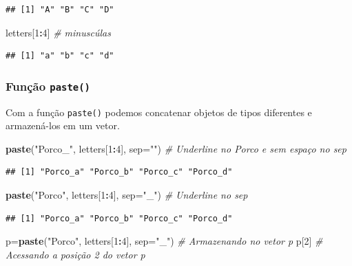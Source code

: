 \documentclass[
]{book}
\newenvironment{Shaded}{\begin{snugshade}}{\end{snugshade}}
\newcommand{\CommentTok}[1]{\textcolor[rgb]{0.56,0.35,0.01}{\textit{#1}}}
\newcommand{\DataTypeTok}[1]{\textcolor[rgb]{0.13,0.29,0.53}{#1}}
\newcommand{\DecValTok}[1]{\textcolor[rgb]{0.00,0.00,0.81}{#1}}
\newcommand{\KeywordTok}[1]{\textcolor[rgb]{0.13,0.29,0.53}{\textbf{#1}}}
\newcommand{\NormalTok}[1]{#1}
\newcommand{\OperatorTok}[1]{\textcolor[rgb]{0.81,0.36,0.00}{\textbf{#1}}}
\newcommand{\StringTok}[1]{\textcolor[rgb]{0.31,0.60,0.02}{#1}}
\theoremstyle{definition}
\theoremstyle{definition}
\theoremstyle{definition}
\theoremstyle{remark}
\begin{document}
\begin{verbatim}
## [1] "A" "B" "C" "D"
\end{verbatim}

\begin{Shaded}
\begin{Highlighting}[]
\NormalTok{letters[}\DecValTok{1}\OperatorTok{:}\DecValTok{4}\NormalTok{] }\CommentTok{# minuscúlas}
\end{Highlighting}
\end{Shaded}

\begin{verbatim}
## [1] "a" "b" "c" "d"
\end{verbatim}

\hypertarget{funuxe7uxe3o-paste}{%
\subsubsection{\texorpdfstring{Função \texttt{paste()}}{Função paste()}}\label{funuxe7uxe3o-paste}}

Com a função \texttt{paste()} podemos concatenar objetos de tipos diferentes e armazená-los em um vetor.

\begin{Shaded}
\begin{Highlighting}[]
\KeywordTok{paste}\NormalTok{(}\StringTok{"Porco_"}\NormalTok{, letters[}\DecValTok{1}\OperatorTok{:}\DecValTok{4}\NormalTok{], }\DataTypeTok{sep=}\StringTok{""}\NormalTok{)   }\CommentTok{# Underline no Porco e sem espaço no sep}
\end{Highlighting}
\end{Shaded}

\begin{verbatim}
## [1] "Porco_a" "Porco_b" "Porco_c" "Porco_d"
\end{verbatim}

\begin{Shaded}
\begin{Highlighting}[]
\KeywordTok{paste}\NormalTok{(}\StringTok{"Porco"}\NormalTok{, letters[}\DecValTok{1}\OperatorTok{:}\DecValTok{4}\NormalTok{], }\DataTypeTok{sep=}\StringTok{"_"}\NormalTok{)   }\CommentTok{# Underline no sep}
\end{Highlighting}
\end{Shaded}

\begin{verbatim}
## [1] "Porco_a" "Porco_b" "Porco_c" "Porco_d"
\end{verbatim}

\begin{Shaded}
\begin{Highlighting}[]
\NormalTok{p=}\KeywordTok{paste}\NormalTok{(}\StringTok{"Porco"}\NormalTok{, letters[}\DecValTok{1}\OperatorTok{:}\DecValTok{4}\NormalTok{], }\DataTypeTok{sep=}\StringTok{"_"}\NormalTok{) }\CommentTok{# Armazenando no vetor p}
\NormalTok{p[}\DecValTok{2}\NormalTok{]                                    }\CommentTok{# Acessando a posição 2 do vetor p}
\end{Highlighting}
\end{Shaded}
\end{document}
